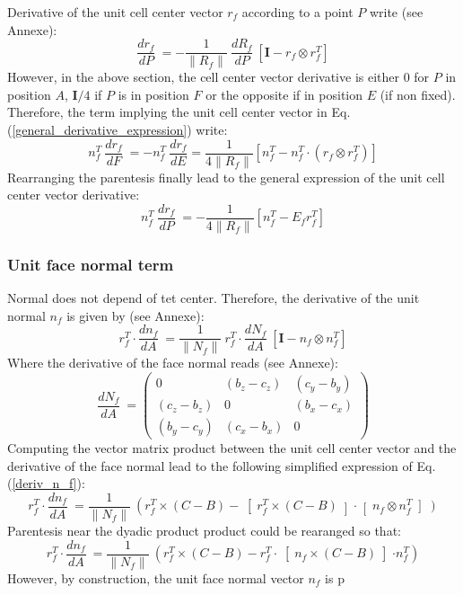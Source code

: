 \documentclass[11pt]{article}
\begin{document}
Derivative of the unit cell center vector $r_f$ according to a point $P$ write (see Annexe):
\begin{equation}
\frac{d r_f}{dP}\ = 
- \frac{1}{\| R_f \|}\ \frac{d R_f}{dP}\ \left[ \boldsymbol{I} - r_f \otimes r_f^T \right] 
\end{equation}
However, in the above section, the cell center vector derivative is either 0 for $P$ in position $A$, $\boldsymbol{I} /4$ if $P$ is in position $F$ or the opposite if in position $E$ (if non fixed). 
Therefore, the term implying the unit cell center vector in Eq. (\ref{general_derivative_expression}) write:
\begin{equation}
n_f^T\ \frac{d r_f}{dF}\ = - n_f^T\ \frac{d r_f}{dE} =
 \frac{1}{4 \| R_f \|} \left[n_f^T- n_f^T \cdot (r_f \otimes r_f^T) \right]
\end{equation}
Rearranging the parentesis finally lead to the general expression of the unit cell center vector derivative:
\begin{equation}
n_f^T\ \frac{d r_f}{dP}\ = 
- \frac{1}{4 \| R_f \|} \left[ n_f^T - E_f r_f^T \right]
\end{equation}


\subsubsection{Unit face normal term}

Normal does not depend of tet center. Therefore, the derivative of the unit normal $n_f$ is given by (see Annexe):
\begin{equation}
r_f^T\cdot \frac{d n_f}{dA}\ = 
 \frac{1}{\| N_f \|}\ r_f^T\cdot \frac{d N_f}{dA}\ \left[ \boldsymbol{I} -  n_f \otimes n_f^T \right]
 \label{deriv_n_f}
\end{equation}
Where the derivative of the face normal reads (see Annexe):
\begin{equation}
\frac{d N_f}{dA}\ = \begin{pmatrix}
0 & (b_z-c_z) & (c_y-b_y) \\
(c_z-b_z) & 0 & (b_x-c_x) \\
(b_y-c_y) & (c_x-b_x) & 0
\end{pmatrix} 
\end{equation}
Computing the vector matrix product between the unit cell center vector and the derivative of the face normal lead to the following simplified expression of Eq. (\ref{deriv_n_f}):
\begin{equation}
r_f^T\cdot \frac{d n_f}{dA}\ = 
 \frac{1}{\| N_f \|}\  \left( r_f^T \times (C-B) -  
 \right[r_f^T \times (C-B)\left] \cdot \right[n_f \otimes n_f^T\left] \right)
\end{equation}
Parentesis near the dyadic product product could be rearanged so that:
\begin{equation}
r_f^T\cdot \frac{d n_f}{dA}\ = 
 \frac{1}{\| N_f \|}\  \left( r_f^T \times (C-B) -  r_f^T \cdot
 \right[n_f \times (C-B) \left] \cdot n_f^T \right)
\end{equation}
However, by construction, the unit face normal vector $n_f$ is p
\end{document}

